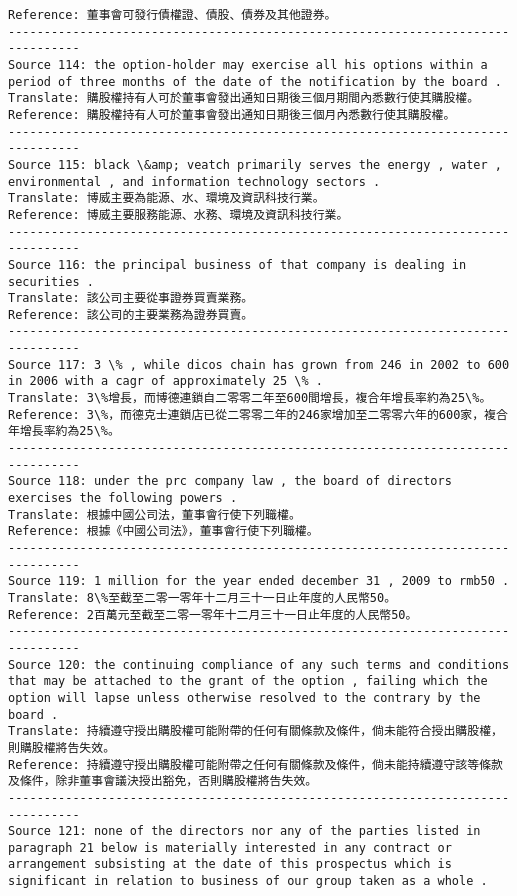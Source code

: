 \documentclass[11pt]{article}
\begin{document}
\begin{Verbatim}[commandchars=\\\{\}]
Reference: 董事會可發行債權證、債股、債券及其他證券。
--------------------------------------------------------------------------------
Source 114: the option-holder may exercise all his options within a period of three months of the date of the notification by the board .
Translate: 購股權持有人可於董事會發出通知日期後三個月期間內悉數行使其購股權。
Reference: 購股權持有人可於董事會發出通知日期後三個月內悉數行使其購股權。
--------------------------------------------------------------------------------
Source 115: black \&amp; veatch primarily serves the energy , water , environmental , and information technology sectors .
Translate: 博威主要為能源、水、環境及資訊科技行業。
Reference: 博威主要服務能源、水務、環境及資訊科技行業。
--------------------------------------------------------------------------------
Source 116: the principal business of that company is dealing in securities .
Translate: 該公司主要從事證券買賣業務。
Reference: 該公司的主要業務為證券買賣。
--------------------------------------------------------------------------------
Source 117: 3 \% , while dicos chain has grown from 246 in 2002 to 600 in 2006 with a cagr of approximately 25 \% .
Translate: 3\%增長，而博德連鎖自二零零二年至600間增長，複合年增長率約為25\%。
Reference: 3\%，而德克士連鎖店已從二零零二年的246家增加至二零零六年的600家，複合年增長率約為25\%。
--------------------------------------------------------------------------------
Source 118: under the prc company law , the board of directors exercises the following powers .
Translate: 根據中國公司法，董事會行使下列職權。
Reference: 根據《中國公司法》，董事會行使下列職權。
--------------------------------------------------------------------------------
Source 119: 1 million for the year ended december 31 , 2009 to rmb50 .
Translate: 8\%至截至二零一零年十二月三十一日止年度的人民幣50。
Reference: 2百萬元至截至二零一零年十二月三十一日止年度的人民幣50。
--------------------------------------------------------------------------------
Source 120: the continuing compliance of any such terms and conditions that may be attached to the grant of the option , failing which the option will lapse unless otherwise resolved to the contrary by the board .
Translate: 持續遵守授出購股權可能附帶的任何有關條款及條件，倘未能符合授出購股權，則購股權將告失效。
Reference: 持續遵守授出購股權可能附帶之任何有關條款及條件，倘未能持續遵守該等條款及條件，除非董事會議決授出豁免，否則購股權將告失效。
--------------------------------------------------------------------------------
Source 121: none of the directors nor any of the parties listed in paragraph 21 below is materially interested in any contract or arrangement subsisting at the date of this prospectus which is significant in relation to business of our group taken as a whole .

\end{Verbatim}
\end{document}
